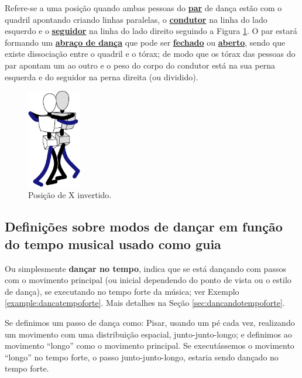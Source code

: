 \begin{definition}
\label{def:X-invertido-position} 
Refere-se a uma posição quando ambas pessoas do \hyperref[def:Par]{\textbf{par}} 
de dança estão com o quadril apontando criando linhas paralelas,
o \hyperref[def:Condutor]{\textbf{condutor}} na linha do lado esquerdo e
o \hyperref[def:Seguidor]{\textbf{seguidor}} na linha do lado direito seguindo a Figura \ref{fig:positiongeralsamba:xinvertido}.
O par estará formando um \hyperref[def:abracodedanca]{\textbf{abraço de dança}}
que pode ser \hyperref[def:closed-position]{\textbf{fechado}} 
ou \hyperref[def:open-position]{\textbf{aberto}},
sendo que existe dissociação entre o quadril e o tórax;
de modo que os tórax das pessoas do par apontam um ao outro e 
o peso do corpo do condutor está na sua perna esquerda e do seguidor na perna direita (ou dividido).
\end{definition}

\begin{figure}[!ht]
         \centering
         \includegraphics[width=0.21\textwidth]{chapters/cap-normas/position-x-inverso.eps}
         \caption{Posição de X invertido.}
         \label{fig:positiongeralsamba:xinvertido}
\end{figure}

\subsection{Definições sobre modos de dançar em função do tempo musical usado como guia}



\begin{definition} 
\label{def:DancaNoTempo}
Ou simplesmente \textbf{dançar no tempo}, indica que se está dançando com passos com o movimento principal 
(ou inicial dependendo do ponto de vista ou o estilo de dança), 
se executando no tempo forte da música; ver Exemplo \ref{example:dancatempoforte}.
Mais detalhes na Seção \ref{sec:dancandotempoforte}.
\end{definition}
\begin{example}
\label{example:dancatempoforte}
Se definimos um passo de dança como: Pisar, usando um pé cada vez, 
realizando um movimento com uma distribuição espacial, junto-junto-longo;
e definimos ao movimento ``longo'' como o movimento principal. 
Se executássemos o movimento ``longo'' no tempo forte, o passo junto-junto-longo,
estaria sendo dançado no tempo forte.
\end{example}

